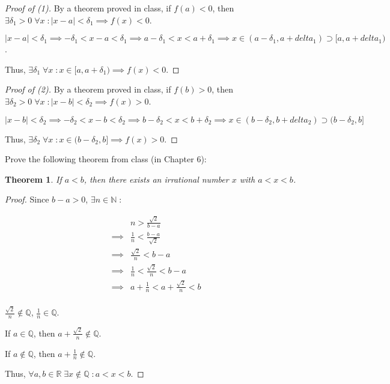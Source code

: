 \documentclass{article} %
\theoremstyle{plain}
\newtheorem*{theorem*}{Theorem}
\theoremstyle{definition}
\begin{document}
\begin{proof}[Proof of (1)]
    By a theorem proved in class, if $f(a) < 0$, then $\exists \delta_1 > 0\; \forall x \; \colon |x-a| < \delta_1 \implies f(x) < 0$.

    $|x-a| < \delta_1 \implies - \delta_1 < x - a < \delta_1 \implies a - \delta_1 < x < a + \delta_1 \implies x \in (a - \delta_1, a + delta_1) \supset [a, a + delta_1)$.

    Thus, $\exists \delta_1 \; \forall x \; \colon x \in [a, a + \delta_1) \implies f(x) < 0$.
\end{proof} 
\begin{proof}[Proof of (2)]
    By a theorem proved in class, if $f(b) > 0$, then $\exists \delta_2 > 0\; \forall x \; \colon |x-b| < \delta_2 \implies f(x) > 0$.

    $|x-b| < \delta_2 \implies - \delta_2 < x - b < \delta_2 \implies b - \delta_2 < x < b + \delta_2 \implies x \in (b - \delta_2, b + delta_2) \supset (b - \delta_2, b]$

    Thus, $\exists \delta_2 \; \forall x \; \colon x \in (b - \delta_2, b] \implies f(x) > 0$.
\end{proof} 

\noindent{} Prove the following theorem from class (in Chapter 6): 

\begin{theorem*} If $a < b$,  then there exists an irrational number $x$ with $a < x < b$. 
\end{theorem*}

\begin{proof}
    Since $b - a > 0$, $\exists n \in \mathbb{N} \; \colon$

    \begin{align*}
        & n > \frac{\sqrt{2}}{b-a} \\
        \implies & \frac{1}{n} < \frac{b-a}{\sqrt{2}} \\
        \implies & \frac{\sqrt{2}}{n} < b-a \\
        \implies & \frac{1}{n} < \frac{\sqrt{2}}{n} < b-a \\
        \implies & a + \frac{1}{n} < a + \frac{\sqrt{2}}{n} < b \\
    \end{align*}

    $\frac{\sqrt{2}}{n} \notin \mathbb{Q}$, $\frac{1}{n} \in \mathbb{Q}$.

    If $a \in \mathbb{Q}$, then $a + \frac{\sqrt{2}}{n} \notin \mathbb{Q}$.

    If $a \notin \mathbb{Q}$, then $a + \frac{1}{n} \notin \mathbb{Q}$.

    Thus, $\forall a,b \in \mathbb{R} \; \exists x \notin \mathbb{Q} \; \colon a < x < b$.
\end{proof} 
\end{document}
